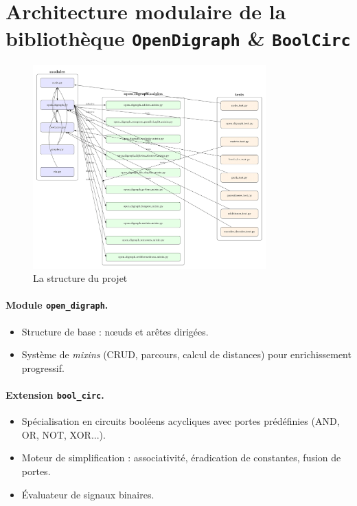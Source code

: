\documentclass[a4paper,12pt]{article}
\begin{document}
\section{Architecture modulaire de la bibliothèque \texttt{OpenDigraph} \& \texttt{BoolCirc}}\label{sec:architecture}
\begin{figure}[H]
    \centering
    \includegraphics[width=0.8\textwidth]{figures/proj-struct.png}
    \caption{La structure du projet}
\end{figure}
\paragraph{Module \texttt{open\_digraph}.}
\begin{itemize}[nosep]
  \item Structure de base : nœuds et arêtes dirigées.
  \item Système de \emph{mixins} (CRUD, parcours, calcul de distances) pour enrichissement progressif.
\end{itemize}

\paragraph{Extension \texttt{bool\_circ}.}
\begin{itemize}[nosep]
  \item Spécialisation en circuits booléens acycliques avec portes prédéfinies (AND, OR, NOT, XOR...).
  \item Moteur de simplification : associativité, éradication de constantes, fusion de portes.
  \item Évaluateur de signaux binaires.
\end{itemize}
\end{document}
